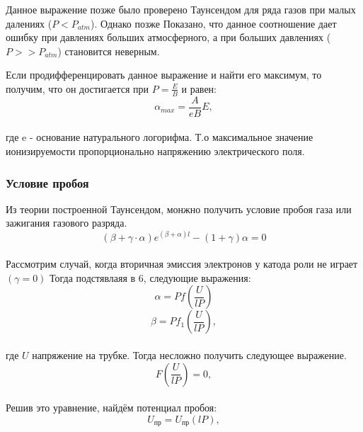\documentclass[a4paper, 12pt]{article}
\begin{document}
Данное выражение позже было проверено Таунсендом для ряда газов при малых далениях ($P < P_{atm}$). Однако позже
Показано, что данное соотношение дает ошибку при давлениях больших атмосферного, а при больших
давлениях ($P >> P_{atm}$) становится неверным.
\par
Если продифференцировать данное выражение и найти его максимум, то получим, что он достигается
при $P = \frac{E}{B}$ и равен:\\
\begin{equation}
    \alpha_{max} = \frac{A}{eB}E,
\end{equation}
\\
где e - основание натурального логорифма. Т.о максимальное значение ионизируемости пропорционально
напряжению электрического поля.



\subsubsection{Условие пробоя}
Из теории построенной Таунсендом, монжно получить условие пробоя газа или зажигания
газового разряда.\\
\begin{equation}
    (\beta + \gamma \cdot \alpha)e^{(\beta + \alpha)l} - (1 + \gamma)\alpha = 0
\end{equation}
\\
Рассмотрим случай, когда вторичная эмиссия электронов у катода роли не играет $(\gamma = 0)$
Тогда подстявлаяя в 6, следующие выражения:\\
\begin{equation*}
    \alpha = P f (\frac{U}{lP})
\end{equation*}
\begin{equation*}
    \beta = P f_1 (\frac{U}{lP}),
\end{equation*}
\\
где $U$ напряжение на трубке. Тогда несложно получить следующее выражение.\\
\begin{equation*}
    F(\frac{U}{lP}) = 0,
\end{equation*}
\\

Решив это уравнение, найдём потенциал пробоя:\\
\begin{equation}
    U_{\text{пр}} = U_{\text{пр}}(lP),
\end{equation}
\\
\end{document}
